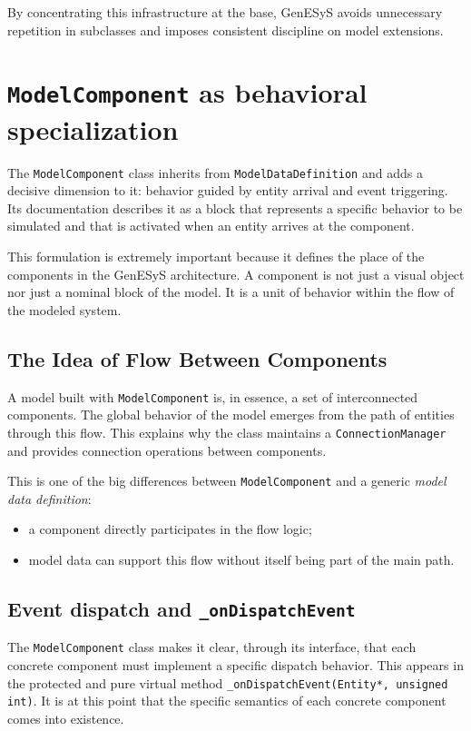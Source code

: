 By concentrating this infrastructure at the base, GenESyS avoids unnecessary repetition in subclasses and imposes consistent discipline on model extensions.

\section{\texttt{ModelComponent} as behavioral specialization}
\label{sec:cap8_modelcomponent}

The \texttt{ModelComponent} class inherits from \texttt{ModelDataDefinition} and adds a decisive dimension to it: behavior guided by entity arrival and event triggering. Its documentation describes it as a block that represents a specific behavior to be simulated and that is activated when an entity arrives at the component.

This formulation is extremely important because it defines the place of the components in the GenESyS architecture. A component is not just a visual object nor just a nominal block of the model. It is a unit of behavior within the flow of the modeled system.

\subsection{The Idea of Flow Between Components}
\label{subsec:cap8_ideia_fluxo_componentes}

A model built with \texttt{ModelComponent} is, in essence, a set of interconnected components. The global behavior of the model emerges from the path of entities through this flow. This explains why the class maintains a \texttt{ConnectionManager} and provides connection operations between components.

This is one of the big differences between \texttt{ModelComponent} and a generic \textit{model data definition}:
\begin{itemize}
 \item a component directly participates in the flow logic;
 \item model data can support this flow without itself being part of the main path.
\end{itemize}

\subsection{Event dispatch and \texttt{\_onDispatchEvent}}
\label{subsec:cap8_dispatch_event_ondispatch}

The \texttt{ModelComponent} class makes it clear, through its interface, that each concrete component must implement a specific dispatch behavior. This appears in the protected and pure virtual method \texttt{\_onDispatchEvent(Entity*, unsigned int)}. It is at this point that the specific semantics of each concrete component comes into existence.

